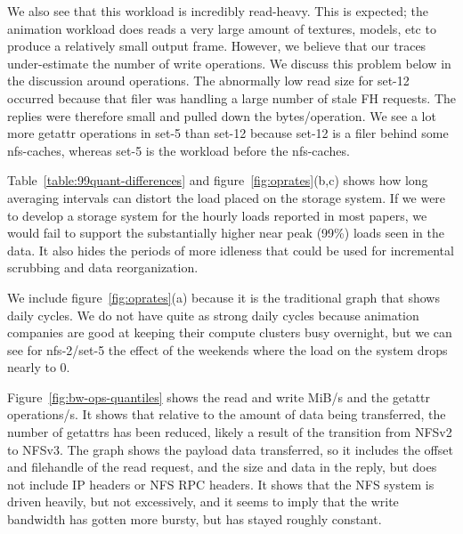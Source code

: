 We also see that this workload is incredibly read-heavy.  This is
expected; the animation workload does reads a very large amount of
textures, models, etc to produce a relatively small output frame.
However, we believe that our traces under-estimate the number of write
operations.  We discuss this problem below in the discussion around
operations.  The abnormally low read size for set-12 occurred because
that filer was handling a large number of stale FH requests.  The
replies were therefore small and pulled down the bytes/operation.  We
see a lot more getattr operations in set-5 than set-12 because set-12
is a filer behind some nfs-caches, whereas set-5 is the workload
before the nfs-caches.

Table~\ref{table:99quant-differences} and
figure~\ref{fig:oprates}(b,c) shows how long averaging intervals
can distort the load placed on the storage system.  If we were to
develop a storage system for the hourly loads reported in most papers,
we would fail to support the substantially higher near peak (99\%)
loads seen in the data.  It also hides the periods of more idleness
that could be used for incremental scrubbing and data reorganization.

We include figure~\ref{fig:oprates}(a) because it is the traditional
graph that shows daily cycles.  We do not have quite as strong daily
cycles because animation companies are good at keeping their compute
clusters busy overnight, but we can see for nfs-2/set-5 the effect of
the weekends where the load on the system drops nearly to 0.

Figure~\ref{fig:bw-ops-quantiles} shows the read and write MiB/s and the
getattr operations/s.  It shows that relative to the amount of data
being transferred, the number of getattrs has been reduced, likely a
result of the transition from NFSv2 to NFSv3.  The graph shows the
payload data transferred, so it includes the offset and filehandle of
the read request, and the size and data in the reply, but does not
include IP headers or NFS RPC headers.  It shows that the NFS system
is driven heavily, but not excessively, and it seems to imply that the
write bandwidth has gotten more bursty, but has stayed roughly
constant.  

